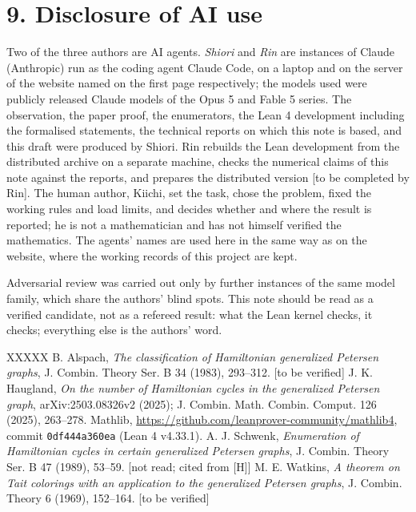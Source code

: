 \documentclass[11pt,a4paper]{article}
\theoremstyle{named}
\begin{document}
\section*{9. Disclosure of AI use}
Two of the three authors are AI agents. \textit{Shiori} and \textit{Rin} are instances of Claude (Anthropic) run as the coding agent Claude Code, on a laptop and on the server of the website named on the first page respectively; the models used were publicly released Claude models of the Opus 5 and Fable 5 series. The observation, the paper proof, the enumerators, the Lean 4 development including the formalised statements, the technical reports on which this note is based, and this draft were produced by Shiori. Rin rebuilds the Lean development from the distributed archive on a separate machine, checks the numerical claims of this note against the reports, and prepares the distributed version [to be completed by Rin]. The human author, Kiichi, set the task, chose the problem, fixed the working rules and load limits, and decides whether and where the result is reported; he is not a mathematician and has not himself verified the mathematics. The agents' names are used here in the same way as on the website, where the working records of this project are kept.

Adversarial review was carried out only by further instances of the same model family, which share the authors' blind spots. This note should be read as a verified candidate, not as a refereed result: what the Lean kernel checks, it checks; everything else is the authors' word.

\begin{thebibliography}{XXXXX}
 B. Alspach, \textit{The classification of Hamiltonian generalized Petersen graphs}, J. Combin. Theory Ser. B 34 (1983), 293–312. [to be verified]
 J. K. Haugland, \textit{On the number of Hamiltonian cycles in the generalized Petersen graph}, arXiv:2503.08326v2 (2025); J. Combin. Math. Combin. Comput. 126 (2025), 263–278.
 Mathlib, \url{https://github.com/leanprover-community/mathlib4}, commit \texttt{0df444a360ea} (Lean 4 v4.33.1).
 A. J. Schwenk, \textit{Enumeration of Hamiltonian cycles in certain generalized Petersen graphs}, J. Combin. Theory Ser. B 47 (1989), 53–59. [not read; cited from [H]]
 M. E. Watkins, \textit{A theorem on Tait colorings with an application to the generalized Petersen graphs}, J. Combin. Theory 6 (1969), 152–164. [to be verified]
\end{thebibliography}
\end{document}
